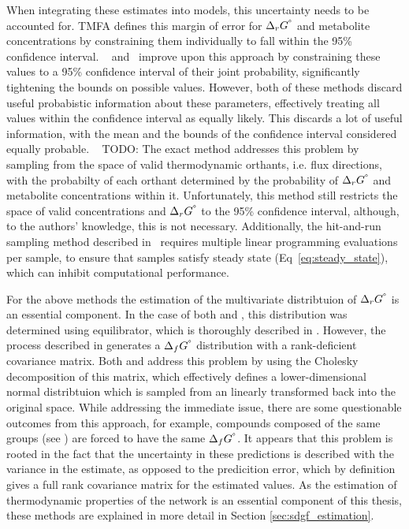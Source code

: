 \documentclass[10pt,letterpaper]{article}
\newcommand{\sdgf}{\Delta_fG^{\degree}}
\newcommand{\sdgr}{\Delta_rG^{\degree}}
\begin{document}
When integrating these estimates into models, this uncertainty needs to be accounted for.
TMFA \cite{HENRY_2007_tmfa} defines this margin of error for $\sdgr$ and metabolite concentrations by constraining them individually to fall within the 95\% confidence interval.
~\cite{multiTFA} and~\cite{PTA} improve upon this approach by constraining these values to a 95\% confidence interval of their joint probability, significantly tightening the bounds on possible values.
However, both of these methods discard useful probabistic information about these parameters, effectively treating all values within the confidence interval as equally likely.
This discards a lot of useful information, with the mean and the bounds of the confidence interval considered equally probable.
~\cite{PTA} {TODO: The exact method} addresses this problem by sampling from the space of valid thermodynamic orthants, i.e. flux directions, with the probabilty of each orthant determined by the probability of $\sdgr$ and metabolite concentrations within it.
Unfortunately, this method still restricts the space of valid concentrations and $\sdgr$ to the 95\% confidence interval, although, to the authors' knowledge, this is not necessary.
Additionally, the hit-and-run sampling method described in~\cite{PTA} requires multiple linear programming evaluations per sample, to ensure that samples satisfy steady state (Eq~\ref{eq:steady_state}), which can inhibit computational performance.

For the above methods the estimation of the multivariate distribtuion of $\sdgr$ is an essential component.
In the case of both \cite{PTA} and \cite{multiTFA}, this distribution was determined using equilibrator, which is thoroughly described in \cite{equilibrator_3_beber_noor}.
However, the process described in \cite{equilibrator_3_beber_noor} generates a $\sdgf$ distribution with a rank-deficient covariance matrix.
Both \cite{PTA} and \cite{multiTFA} address this problem by using the Cholesky decomposition of this matrix, which effectively defines a lower-dimensional normal distribtuion which is sampled from an linearly transformed back into the original space.
While addressing the immediate issue, there are some questionable outcomes from this approach, for example, compounds composed of the same groups (see \cite{JANKOWSKI_2008_group_contribution}) are forced to have the same $\sdgf$.
It appears that this problem is rooted in the fact that the uncertainty in these predictions is described with the variance in the estimate, as opposed to the predicition error, which by definition gives a full rank covariance matrix for the estimated values.
As the estimation of thermodynamic properties of the network is an essential component of this thesis, these methods are explained in more detail in Section \ref{sec:sdgf_estimation}.
\end{document}
